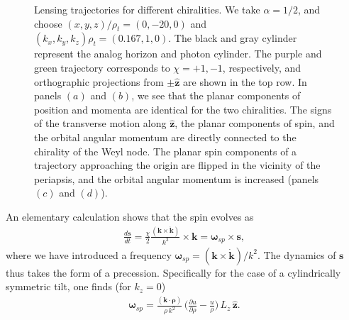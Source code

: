 \documentclass[submission, Phys]{SciPost}
\begin{document}
\begin{figure}[ht!]
    \caption{Lensing trajectories for different chiralities.
    We take $\alpha=1/2$, and choose $(x,y,z)/\rho_t=(0,-20,0)$ and $(k_x,k_y,k_z)\rho_t=(0.167,1,0)$.
    The black and gray cylinder represent the analog horizon and photon cylinder. The purple and green trajectory corresponds to $\chi={+1,-1}$, respectively, and orthographic projections from $\pm\hat{\bm z}$ are shown in the top row. In panels $(a)$ and $(b)$, we see that the planar components of position and momenta are identical for the two chiralities. The signs of the transverse motion along $\hat{\bm z}$, the planar components of spin, and the orbital angular momentum are directly connected to the chirality of the Weyl node. The planar spin components of a trajectory approaching the origin are flipped in the vicinity of the periapsis, and the orbital angular momentum is increased (panels $(c)$ and $(d)$).}
    \label{fig:LensPrec_1}
\end{figure}

An elementary calculation shows that the spin evolves as
\begin{align}
    \frac{d \bm{s}}{dt}= \frac{ \chi}{2}\frac{( \bm{k}\times \dot{\bm{k}} )}{k^3}\times \bm{k}=\bm{\omega}_{sp} \times \bm{s},
    \label{eq:spin_precession}
\end{align}
where we have introduced a frequency $\bm{\omega}_{sp}= {( \bm{k} \times \dot{\bm{k}} )}/{k^2}$. The dynamics of $\bm{s}$ thus takes the form of a precession. Specifically for the case of a cylindrically symmetric tilt, one finds (for $k_z=0$)
\begin{eqnarray}
    \bm{\omega}_{sp}=\frac{(\bm k \cdot \hat{\bm \rho})}{\rho \,k^2}\, \bigg( \frac{\partial u}{\partial \rho}-\frac{u}{\rho}\bigg)\,L_z\,\hat{\bm z}.
\end{eqnarray}
\end{document}
